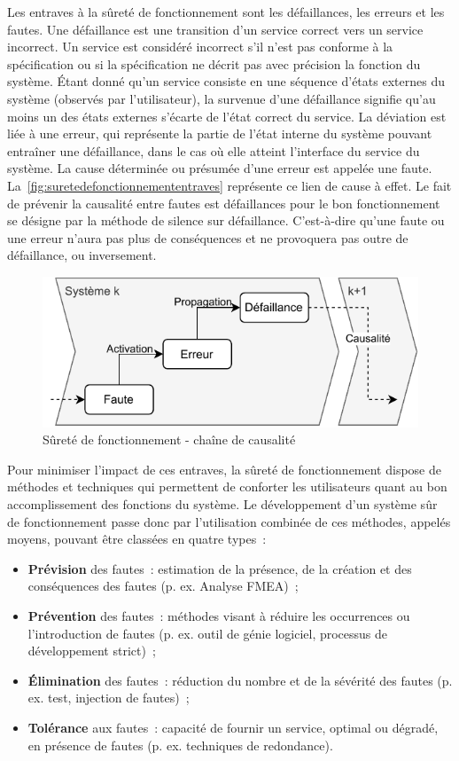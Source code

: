 \documentclass[french, a4paper, 11pt, twoside, pdftex]{StyleThese}
\begin{document}
		Les entraves à la sûreté de fonctionnement sont les défaillances, les erreurs et les fautes. Une défaillance est une transition d’un service correct vers un service incorrect. Un service est considéré incorrect s’il n’est pas conforme à la spécification ou si la spécification ne décrit pas avec précision la fonction du système. Étant donné qu’un service consiste en une séquence d’états externes du système (observés par l’utilisateur), la survenue d’une défaillance signifie qu’au moins un des états externes s’écarte de l’état correct du service. La déviation est liée à une erreur, qui représente la partie de l’état interne du système pouvant entraîner une défaillance, dans le cas où elle atteint l’interface du service du système. La cause déterminée ou présumée d’une erreur est appelée une faute. La~\autoref{fig:suretedefonctionnemententraves} représente ce lien de cause à effet. Le fait de prévenir la causalité entre fautes est défaillances pour le bon fonctionnement se désigne par la méthode de silence sur défaillance. C'est-à-dire qu'une faute ou une erreur n'aura pas plus de conséquences et ne provoquera pas outre de défaillance, ou inversement.
		
		\begin{figure}[ht]
			\centering
			\includegraphics[width=0.7\linewidth]{schemas/SureteDeFonctionnement_entraves}
			\caption{Sûreté de fonctionnement - chaîne de causalité}
			\label{fig:suretedefonctionnemententraves}
		\end{figure}
		
		Pour minimiser l’impact de ces entraves, la sûreté de fonctionnement dispose de méthodes et techniques qui permettent de conforter les utilisateurs quant au bon accomplissement des fonctions du système. Le développement d’un système sûr de fonctionnement passe donc par l’utilisation combinée de ces méthodes, appelés moyens, pouvant être classées en quatre types~:
		\begin{itemize}
			\item \textbf{Prévision} des fautes~: estimation de la présence, de la création et des conséquences des fautes (p. ex. Analyse FMEA)~;
			\item \textbf{Prévention} des fautes~: méthodes visant à réduire les occurrences ou l’introduction de fautes (p. ex. outil de génie logiciel, processus de développement strict)~;
			\item \textbf{Élimination} des fautes~: réduction du nombre et de la sévérité des fautes (p. ex. test, injection de fautes)~;
			\item \textbf{Tolérance} aux fautes~: capacité de fournir un service, optimal ou dégradé, en présence de fautes (p. ex. techniques de redondance).
		\end{itemize}
	
\end{document}
